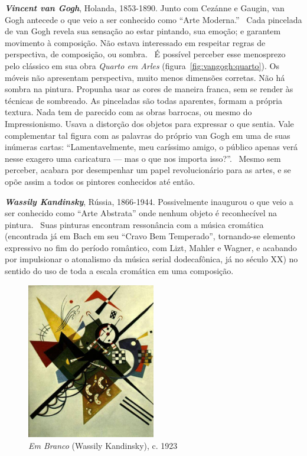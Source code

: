 \textbf{\emph{Vincent van Gogh}}, Holanda, 1853-1890. Junto com
Cezánne e Gaugin, van Gogh antecede o que veio a ser conhecido como
``Arte Moderna.''~\cite{gombrich} Cada pincelada de van Gogh revela
sua sensação ao estar pintando, sua emoção; e garantem movimento à
composição. Não estava interessado em respeitar regras de perspectiva,
de composição, ou sombra.~\cite{hulsker} É possível perceber esse
menosprezo pelo clássico em sua obra \textit{Quarto em Arles}
(figura~\ref{fig:vangogh:quarto}). Os móveis não apresentam
perspectiva, muito menos dimensões corretas. Não há sombra na
pintura. Propunha usar as cores de maneira franca, sem se render às
técnicas de sombreado. As pinceladas são todas aparentes, formam a
própria textura. Nada tem de parecido com as obras barrocas, ou mesmo
do Impressionismo. Usava a distorção dos objetos para expressar o que
sentia. Vale complementar tal figura com as palavras do próprio van
Gogh em uma de suas inúmeras cartas: ``Lamentavelmente, meu caríssimo
amigo, o público apenas verá nesse exagero uma caricatura --- mas o
que nos importa isso?''.~\cite{van1958} Mesmo sem perceber, acabara
por desempenhar um papel revolucionário para as artes, e se opõe assim
a todos os pintores conhecidos até então.

\textbf{\emph{Wassily Kandinsky}}, Rússia, 1866-1944. Possivelmente
inaugurou o que veio a ser conhecido como ``Arte Abstrata'' onde
nenhum objeto é reconhecível na pintura.~\cite{duchting} Suas pinturas
encontram ressonância com a música cromática (encontrada já em Bach em
seu ``Cravo Bem Temperado'', tornando-se elemento expressivo no fim do
período romântico, com Lizt, Mahler e Wagner, e acabando por
impulsionar o atonalismo da música serial dodecafônica, já no século
XX) no sentido do uso de toda a escala cromática em uma
composição.~\cite{gombrich} 

\begin{figure}
  \begin{centering}
    \caption{\emph{Em Branco} (Wassily Kandinsky), c. 1923}
    \label{fig:kandinsky:white}
    \includegraphics[width=0.5\textwidth]{figs/kandinsky_white.png}
  \end{centering}
\end{figure}

